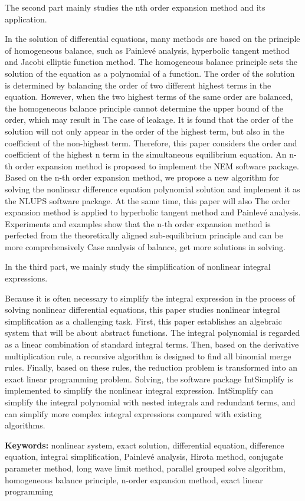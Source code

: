 The second part mainly studies the nth order expansion method and its application.

In the solution of differential equations, many methods are based on the principle of homogeneous balance, such as Painlevé analysis, hyperbolic tangent method and Jacobi elliptic function method. The homogeneous balance principle sets the solution of the equation as a polynomial of a function. The order of the solution is determined by balancing the order of two different highest terms in the equation. However, when the two highest terms of the same order are balanced, the homogeneous balance principle cannot determine the upper bound of the order, which may result in The case of leakage. It is found that the order of the solution will not only appear in the order of the highest term, but also in the coefficient of the non-highest term. Therefore, this paper considers the order and coefficient of the highest n term in the simultaneous equilibrium equation. An n-th order expansion method is proposed to implement the NEM software package. Based on the n-th order expansion method, we propose a new algorithm for solving the nonlinear difference equation polynomial solution and implement it as the NLUPS software package. At the same time, this paper will also The order expansion method is applied to hyperbolic tangent method and Painlevé analysis. Experiments and examples show that the n-th order expansion method is perfected from the theoretically aligned sub-equilibrium principle and can be more comprehensively Case analysis of balance, get more solutions in solving.

In the third part, we mainly study the simplification of nonlinear integral expressions.

Because it is often necessary to simplify the integral expression in the process of solving nonlinear differential equations, this paper studies nonlinear integral simplification as a challenging task. First, this paper establishes an algebraic system that will be about abstract functions. The integral polynomial is regarded as a linear combination of standard integral terms. Then, based on the derivative multiplication rule, a recursive algorithm is designed to find all binomial merge rules. Finally, based on these rules, the reduction problem is transformed into an exact linear programming problem. Solving, the software package IntSimplify is implemented to simplify the nonlinear integral expression. IntSimplify can simplify the integral polynomial with nested integrals and redundant terms, and can simplify more complex integral expressions compared with existing algorithms.

\bigskip
\noindent\textbf{ Keywords:}
nonlinear system, exact solution, differential equation, difference equation, integral simplification, Painlevé analysis, Hirota method, conjugate parameter method, long wave limit method, parallel grouped solve algorithm, homogeneous balance principle, n-order expansion method, exact linear programming
